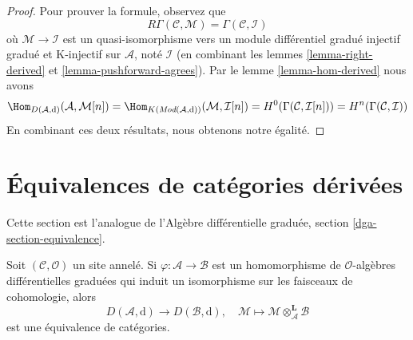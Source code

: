 \begin{proof}
Pour prouver la formule, observez que
$$
R\Gamma(\mathcal{C}, \mathcal{M}) = \Gamma(\mathcal{C}, \mathcal{I})
$$
où $\mathcal{M} \to \mathcal{I}$ est un quasi-isomorphisme vers un module différentiel gradué injectif gradué et K-injectif sur $\mathcal{A}$, noté $\mathcal{I}$ (en combinant les lemmes \ref{lemma-right-derived} et \ref{lemma-pushforward-agrees}).
Par le lemme \ref{lemma-hom-derived}  nous avons
$$
\Hom_{D(\mathcal{A}, \text{d})}(\mathcal{A}, \mathcal{M}[n]) =
\Hom_{K(\textit{Mod}(\mathcal{A}, \text{d}))}(\mathcal{M}, \mathcal{I}[n]) =
H^0(\Gamma(\mathcal{C}, \mathcal{I}[n])) =
H^n(\Gamma(\mathcal{C}, \mathcal{I}))
$$
En combinant ces deux résultats, nous obtenons notre égalité.
\end{proof}








\section{Équivalences de catégories dérivées}
\label{section-equivalence}

\noindent
Cette section est l'analogue de l'Algèbre différentielle graduée, section \ref{dga-section-equivalence}.

\begin{lemma}
\label{lemma-qis-equivalence}
Soit $(\mathcal{C}, \mathcal{O})$ un site annelé.
Si $\varphi : \mathcal{A} \to \mathcal{B}$ est un homomorphisme de $\mathcal{O}$-algèbres différentielles graduées qui induit un isomorphisme sur les faisceaux de cohomologie, alors
$$
D(\mathcal{A}, \text{d}) \longrightarrow D(\mathcal{B}, \text{d}), \quad
\mathcal{M}
\longmapsto
\mathcal{M} \otimes_\mathcal{A}^\mathbf{L} \mathcal{B}
$$
est une équivalence de catégories.
\end{lemma}

